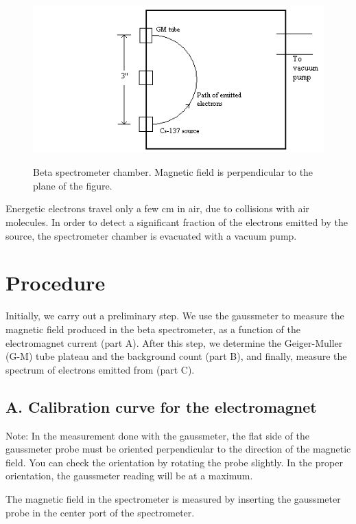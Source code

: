 \begin{figure}
\begin{centering}
\includegraphics[width=4.9992in,height=2.528in]{../images/beta-img5.png} 
\caption{Beta spectrometer chamber.  Magnetic field is perpendicular to the plane of the figure.}
\label{fig:chamber}
\end{centering}
\end{figure}

Energetic electrons travel only a few cm in air, due to collisions with
air molecules.  In order to detect a significant fraction of the
electrons emitted by the \cs source, the spectrometer chamber is
evacuated with a vacuum pump.

\section{Procedure}

Initially, we carry out a preliminary step.  We use the gaussmeter
to measure the magnetic field produced in the beta spectrometer, as a
function of the electromagnet current (part A).  After this step, we
determine the Geiger-Muller (G-M) tube plateau and the background count
(part B), and finally, measure the spectrum of electrons emitted from
\cs (part C).

\subsection{A. Calibration curve for the electromagnet}

Note: In the measurement done with the gaussmeter, the flat side of the
gaussmeter probe must be oriented perpendicular to the direction of the
magnetic field.  You can check the orientation by rotating the probe
slightly.  In the proper orientation, the gaussmeter reading will be
at a maximum.

The magnetic field in the spectrometer is measured by inserting the
gaussmeter probe in the center port of the spectrometer.

